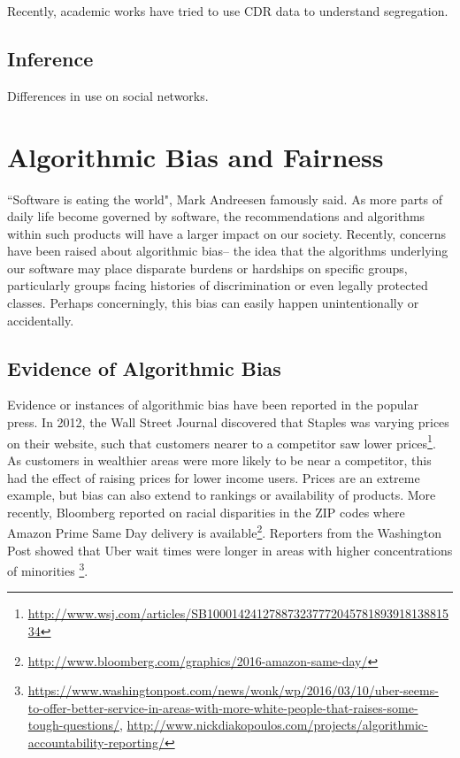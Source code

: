 \documentclass[12pt]{article}
\begin{document}
Recently, academic works have tried to use CDR data to understand segregation.
\cite{amini2014impact}
\cite{manduca2015mobile}
\cite{desu2015untangling}
\cite{blumenstock2015neighborhood}


\subsection{Inference}

\cite{zhong2015where}



Differences in use on social networks.




\section{Algorithmic Bias and Fairness}
\label{sec:fair}
``Software is eating the world", Mark Andreesen famously said. 
As more parts of daily life become governed by software, the recommendations and algorithms within such products will have a larger impact on our society.
Recently, concerns have been raised about algorithmic bias-- the idea that the algorithms underlying our software may place disparate burdens or hardships on specific groups, particularly groups facing histories of discrimination or even legally protected classes.
Perhaps concerningly, this bias can easily happen unintentionally or accidentally.

\subsection{Evidence of Algorithmic Bias}
Evidence or instances of algorithmic bias have been reported in the popular press.
In 2012, the Wall Street Journal discovered that Staples was varying prices on their website, such that customers nearer to a competitor saw lower prices\footnote{\url{http://www.wsj.com/articles/SB10001424127887323777204578189391813881534}}.
As customers in wealthier areas were more likely to be near a competitor, this had the effect of raising prices for lower income users.
Prices are an extreme example, but bias can also extend to rankings or availability of products.
More recently, Bloomberg reported on racial disparities in the ZIP codes where Amazon Prime Same Day delivery is available\footnote{\url{http://www.bloomberg.com/graphics/2016-amazon-same-day/}}.
Reporters from the Washington Post showed that Uber wait times were longer in areas with higher concentrations of minorities \footnote{\url{https://www.washingtonpost.com/news/wonk/wp/2016/03/10/uber-seems-to-offer-better-service-in-areas-with-more-white-people-that-raises-some-tough-questions/}, \url{http://www.nickdiakopoulos.com/projects/algorithmic-accountability-reporting/}}.
\end{document}
